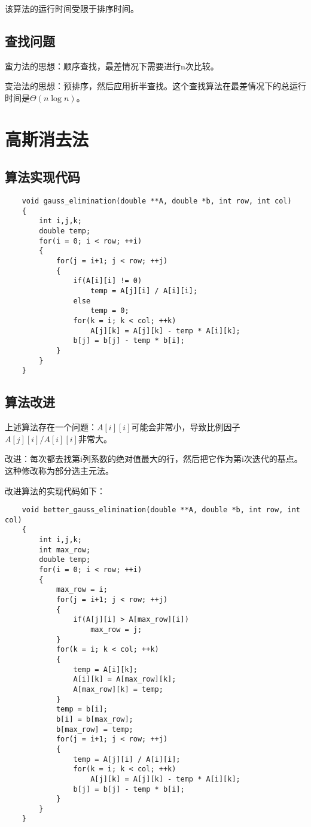 \documentclass[a4paper,left=2.5cm,right=2.5cm,11pt]{article}
\begin{document}
	该算法的运行时间受限于排序时间。

\subsection{查找问题}
	蛮力法的思想：顺序查找，最差情况下需要进行n次比较。\par
	变治法的思想：预排序，然后应用折半查找。这个查找算法在最差情况下的总运行时间是$\Theta(n\log n)$。

\section{高斯消去法}
\subsection{算法实现代码}
	\begin{lstlisting}
	void gauss_elimination(double **A, double *b, int row, int col)
	{
		int i,j,k;
		double temp;
		for(i = 0; i < row; ++i)
		{
			for(j = i+1; j < row; ++j)
			{
				if(A[i][i] != 0)
					temp = A[j][i] / A[i][i];
				else
					temp = 0;
				for(k = i; k < col; ++k)
					A[j][k] = A[j][k] - temp * A[i][k];
				b[j] = b[j] - temp * b[i];
			}
		}
	}
	\end{lstlisting}

\subsection{算法改进}
	上述算法存在一个问题：$A[i][i]$可能会非常小，导致比例因子$A[j][i]/A[i][i]$非常大。\par
	改进：每次都去找第i列系数的绝对值最大的行，然后把它作为第i次迭代的基点。这种修改称为部分选主元法。\par
	改进算法的实现代码如下：
	\begin{lstlisting}
	void better_gauss_elimination(double **A, double *b, int row, int col)
	{
		int i,j,k;
		int max_row;
		double temp;
		for(i = 0; i < row; ++i)
		{
			max_row = i;
			for(j = i+1; j < row; ++j)
			{
				if(A[j][i] > A[max_row][i])
					max_row = j;
			}
			for(k = i; k < col; ++k)
			{
				temp = A[i][k];
				A[i][k] = A[max_row][k];
				A[max_row][k] = temp;
			}
			temp = b[i];
			b[i] = b[max_row];
			b[max_row] = temp;
			for(j = i+1; j < row; ++j)
			{
				temp = A[j][i] / A[i][i];
				for(k = i; k < col; ++k)
					A[j][k] = A[j][k] - temp * A[i][k];
				b[j] = b[j] - temp * b[i];
			} 
		}
	}
	\end{lstlisting}
\end{document}

